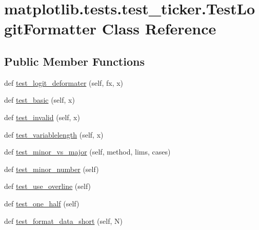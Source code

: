 \hypertarget{classmatplotlib_1_1tests_1_1test__ticker_1_1TestLogitFormatter}{}\section{matplotlib.\+tests.\+test\+\_\+ticker.\+Test\+Logit\+Formatter Class Reference}
\label{classmatplotlib_1_1tests_1_1test__ticker_1_1TestLogitFormatter}
\subsection*{Public Member Functions}
\begin{DoxyCompactItemize}
\item 
def \hyperlink{classmatplotlib_1_1tests_1_1test__ticker_1_1TestLogitFormatter_a57cfad918d1232daa2f854727c7e5fca}{test\+\_\+logit\+\_\+deformater} (self, fx, x)
\item 
def \hyperlink{classmatplotlib_1_1tests_1_1test__ticker_1_1TestLogitFormatter_ac990f0e855991d47469a02e5836dcc8d}{test\+\_\+basic} (self, x)
\item 
def \hyperlink{classmatplotlib_1_1tests_1_1test__ticker_1_1TestLogitFormatter_a7d84880533941768c20bb6de30cf7909}{test\+\_\+invalid} (self, x)
\item 
def \hyperlink{classmatplotlib_1_1tests_1_1test__ticker_1_1TestLogitFormatter_a114554a799fb3db7922fad7d29bd02da}{test\+\_\+variablelength} (self, x)
\item 
def \hyperlink{classmatplotlib_1_1tests_1_1test__ticker_1_1TestLogitFormatter_a2f788422b0b04ad7d5324bd397313957}{test\+\_\+minor\+\_\+vs\+\_\+major} (self, method, lims, cases)
\item 
def \hyperlink{classmatplotlib_1_1tests_1_1test__ticker_1_1TestLogitFormatter_a45b19aa4349b1e5ec91de532da90a1eb}{test\+\_\+minor\+\_\+number} (self)
\item 
def \hyperlink{classmatplotlib_1_1tests_1_1test__ticker_1_1TestLogitFormatter_ae14a5706a59bb3a4de92c79d2c0bab9d}{test\+\_\+use\+\_\+overline} (self)
\item 
def \hyperlink{classmatplotlib_1_1tests_1_1test__ticker_1_1TestLogitFormatter_a84cf318fa721d1908b29ed37707bfa57}{test\+\_\+one\+\_\+half} (self)
\item 
def \hyperlink{classmatplotlib_1_1tests_1_1test__ticker_1_1TestLogitFormatter_a31a002ecea7ddfc9bc628b04297f923a}{test\+\_\+format\+\_\+data\+\_\+short} (self, N)
\end{DoxyCompactItemize}
